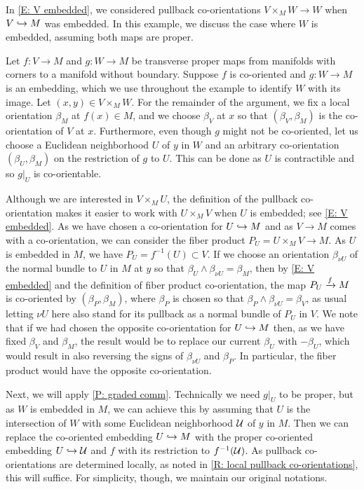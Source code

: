 \begin{example}\label{E: embedded}
	In \cref{E: V embedded}, we considered pullback co-orientations $V \times_M W \to W$ when $V \hookrightarrow M$ was embedded.
	In this example, we discuss the case where $W$ is embedded, assuming both maps are proper.

	Let $f \colon V \to M$ and $g \colon W \to M$ be transverse proper maps from manifolds with corners to a manifold without boundary.
	Suppose $f$ is co-oriented and $g \colon W \to M$ is an embedding, which we use throughout the example to identify $W$ with its image.
	Let $(x,y) \in V \times_M W$.
	For the remainder of the argument, we fix a local orientation $\beta_M$ at $f(x) \in M$, and we choose $\beta_V$ at $x$ so that $(\beta_V,\beta_M)$ is the co-orientation of $V$ at $x$.
	Furthermore, even though $g$ might not be co-oriented, let us choose a Euclidean neighborhood $U$ of $y$ in $W$ and an arbitrary co-orientation $(\beta_U,\beta_M)$ on the restriction of $g$ to $U$.
	This can be done as $U$ is contractible and so $g|_U$ is co-orientable.


	Although we are interested in $V \times_M U$, the definition of the pullback co-orientation makes it easier to work with $U \times_M V$ when $U$ is embedded; see \cref{E: V embedded}.
	As we have chosen a co-orientation for $U \hookrightarrow M$ and as $V \to M$ comes with a co-orientation, we can consider the fiber product $P_U = U \times_M V \to M$.
	As $U$ is embedded in $M$, we have $P_U = f^{-1}(U) \subset V$.
	If we choose an orientation $\beta_{\nu U}$ of the normal bundle to $U$ in $M$ at $y$ so that $\beta_U \wedge \beta_{\nu U} = \beta_M$, then by \cref{E: V embedded} and the definition of fiber product co-orientation, the map $P_U \xrightarrow{f} M$ is co-oriented by $(\beta_P,\beta_M)$, where $\beta_P$ is chosen so that $\beta_P \wedge \beta_{\nu U} = \beta_V$, as usual letting $\nu U$ here also stand for its pullback as a normal bundle of $P_U$ in $V$.
	We note that if we had chosen the opposite co-orientation for $U \hookrightarrow M$ then, as we have fixed $\beta_V$ and $\beta_M$, the result would be to replace our current $\beta_U$ with $-\beta_U$, which would result in also reversing the signs of $\beta_{\nu U}$ and $\beta_P$.
	In particular, the fiber product would have the opposite co-orientation.

	Next, we will apply \cref{P: graded comm}.
	Technically we need $g|_U$ to be proper, but as $W$ is embedded in $M$, we can achieve this by assuming that $U$ is the intersection of $W$ with some Euclidean neighborhood $\mathcal{U}$ of $y$ in $M$.
	Then we can replace the co-oriented embedding $U \hookrightarrow M$ with the proper co-oriented embedding $U \hookrightarrow \mathcal{U}$ and $f$ with its restriction to $f^{-1}(\mathcal{U})$.
	As pullback co-orientations are determined locally, as noted in \cref{R: local pullback co-orientations}, this will suffice.
	For simplicity, though, we maintain our original notations.


\end{example}
